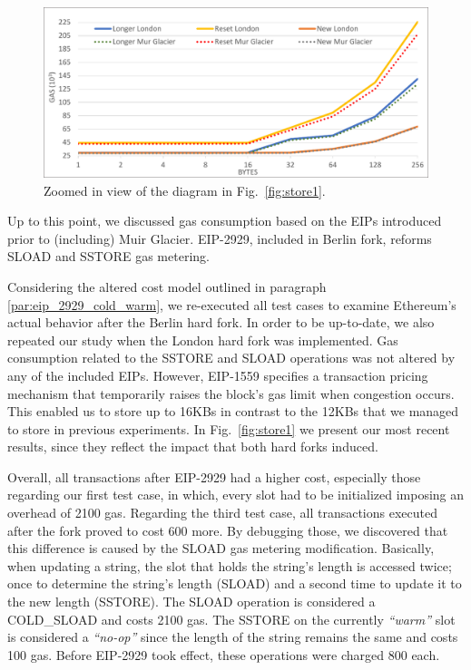 \begin{figure}[htbp]
\centerline{\includegraphics[width=\textwidth]{figs/store2.pdf}}
\caption{Zoomed in view of the diagram in Fig.~\ref{fig:store1}.}
\label{fig:store2}
\end{figure}

Up to this point, we discussed gas consumption based on the EIPs introduced prior to (including) Muir Glacier. EIP-2929, included in Berlin fork, reforms SLOAD and SSTORE gas metering.

Considering the altered cost model outlined in paragraph \ref{par:eip_2929_cold_warm}, we re-executed all test cases to examine Ethereum’s actual behavior after the Berlin hard fork. In order to be up-to-date, we also repeated our study when the London hard fork was implemented. Gas consumption related to the SSTORE and SLOAD operations was not altered by any of the included EIPs. However, EIP-1559 specifies a transaction pricing mechanism that temporarily raises the block’s gas limit when congestion occurs. This enabled us to store up to 16KBs in contrast to the 12KBs that we managed to store in previous experiments. In Fig.~\ref{fig:store1} we present our most recent results, since they reflect the impact that both hard forks induced.

Overall, all transactions after EIP-2929 had a higher cost, especially those regarding our first test case, in which, every slot had to be initialized imposing an overhead of 2100 gas. Regarding the third test case, all transactions executed after the fork proved to cost 600 more. By debugging those, we discovered that this difference is caused by the SLOAD gas metering modification. Basically, when updating a string, the slot that holds the string’s length is accessed twice; once to determine the string’s length (SLOAD) and a second time to update it to the new length (SSTORE). The SLOAD operation is considered a COLD\_SLOAD and costs 2100 gas. The SSTORE on the currently \emph{``warm''} slot is considered a \emph{``no-op''} since the length of the string remains the same and costs 100 gas. Before EIP-2929 took effect, these operations were charged 800 each.

